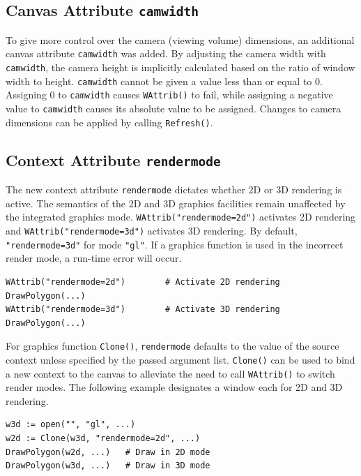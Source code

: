 \documentclass[letterpaper,12pt]{article}
\begin{document}
\subsection{Canvas Attribute \texttt{camwidth}}

To give more control over the camera (viewing volume) dimensions, an additional 
canvas attribute \texttt{camwidth} was added. By adjusting the
camera width with \texttt{camwidth}, the camera height is implicitly
calculated based on the ratio of window width to height. \texttt{camwidth}
cannot be given a value less than or equal to 0. Assigning 0 to 
\texttt{camwidth} causes \texttt{WAttrib()} to fail, while assigning a negative
value to \texttt{camwidth} causes its absolute value to be assigned.
Changes to camera dimensions can be applied by calling \texttt{Refresh()}.

\subsection{Context Attribute \texttt{rendermode}}

The new context attribute \texttt{rendermode} dictates whether 2D or 3D 
rendering is active. The semantics of the 2D and 3D graphics facilities 
remain unaffected by the integrated graphics mode. 
\texttt{WAttrib("rendermode=2d")} activates 2D rendering
and \texttt{WAttrib("rendermode=3d")} activates 3D rendering. By default, 
\texttt{"rendermode=3d"} for mode \texttt{"gl"}. If a graphics function is 
used in the incorrect render mode, a run-time error will occur. 

\begin{verbatim}
WAttrib("rendermode=2d")        # Activate 2D rendering
DrawPolygon(...)
WAttrib("rendermode=3d")        # Activate 3D rendering
DrawPolygon(...)
\end{verbatim}

For graphics function \texttt{Clone()}, \texttt{rendermode} defaults to the 
value of the source context unless specified by the passed argument list. 
\texttt{Clone()} can be used to bind a new context to the canvas to alleviate 
the need to call \texttt{WAttrib()} to switch render modes. The following
example designates a window each for 2D and 3D rendering.

\begin{verbatim}
w3d := open("", "gl", ...)
w2d := Clone(w3d, "rendermode=2d", ...)
DrawPolygon(w2d, ...)	# Draw in 2D mode
DrawPolygon(w3d, ...)   # Draw in 3D mode
\end{verbatim}
\end{document}
